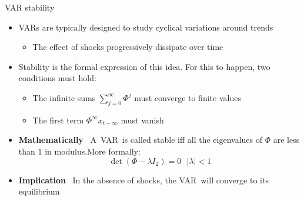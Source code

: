 \documentclass[10pt,handout]{beamer}
\begin{document}
\begin{frame}
{VAR stability}
\begin{itemize}
\item VARs are typically designed to study cyclical variations around trends \smallskip
\begin{itemize}
\item The effect of shocks progressively dissipate over time \medskip
\end{itemize}
\item Stability is the formal expression of this idea. For this to happen, two conditions must hold: \smallskip
\begin{itemize}
\item The infinite sums $\sum_{j=0}^{\infty}\Phi^{j}$ must converge to finite values \smallskip
\item The first term $\Phi^{\infty}x_{t-\infty}$ must vanish \medskip
\end{itemize}
\item \textbf{Mathematically} \ A\ VAR\ is called stable iff all the eigenvalues of $\Phi $ are less than $1$ in modulus.\pause\newline More formally: 
\begin{equation*}
\det \left( \Phi -\lambda I_{2}\right) =0\ \ \ \left\vert \lambda
\right\vert <1
\end{equation*}%
\pause
\item \textbf{Implication} \ In the absence of shocks, the VAR\ will converge to its equilibrium
\end{itemize}
\end{frame} 
\end{document}
